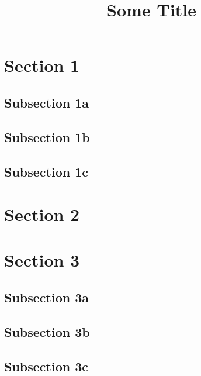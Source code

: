 \documentclass{beamer}
\title{Some Title}
\begin{document}
\begin{frame}
\vfill
{}
\end{frame}

\section{Section 1}
\subsection{Subsection 1a}
\frame{}
\subsection{Subsection 1b}
\frame{}
\subsection{Subsection 1c}
\frame{}

\section{Section 2}
\frame{}

\section{Section 3}
\subsection{Subsection 3a}
\frame{}
\subsection{Subsection 3b}
\frame{}
\subsection{Subsection 3c}
\frame{}
\end{document}
